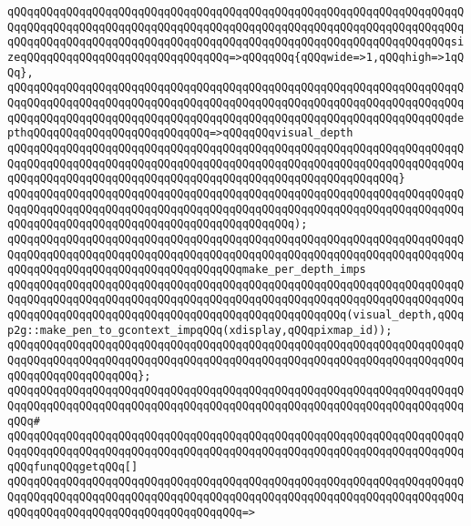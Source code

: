 \verb|qQQqqQQqqQQqqQQqqQQqqQQqqQQqqQQqqQQqqQQqqQQqqQQqqQQqqQQqqQQqqQQqqQQqqQQqqQQqqQQqqQQqqQQqqQQqqQQqqQQqqQQqqQQqqQQqqQQqqQQqqQQqqQQqqQQqqQQqqQQqqQQqqQQqqQQqqQQqqQQqqQQqqQQqqQQqqQQqqQQqqQQqqQQqqQQqqQQqqQQqqQQqqQQqsizeqQQqqQQqqQQqqQQqqQQqqQQqqQQqqQQq=>qQQqqQQq{qQQqwide=>1,qQQqhigh=>1qQQq},|\newline
\verb|qQQqqQQqqQQqqQQqqQQqqQQqqQQqqQQqqQQqqQQqqQQqqQQqqQQqqQQqqQQqqQQqqQQqqQQqqQQqqQQqqQQqqQQqqQQqqQQqqQQqqQQqqQQqqQQqqQQqqQQqqQQqqQQqqQQqqQQqqQQqqQQqqQQqqQQqqQQqqQQqqQQqqQQqqQQqqQQqqQQqqQQqqQQqqQQqqQQqqQQqqQQqqQQqdepthqQQqqQQqqQQqqQQqqQQqqQQqqQQq=>qQQqqQQqvisual_depth|\newline
\verb|qQQqqQQqqQQqqQQqqQQqqQQqqQQqqQQqqQQqqQQqqQQqqQQqqQQqqQQqqQQqqQQqqQQqqQQqqQQqqQQqqQQqqQQqqQQqqQQqqQQqqQQqqQQqqQQqqQQqqQQqqQQqqQQqqQQqqQQqqQQqqQQqqQQqqQQqqQQqqQQqqQQqqQQqqQQqqQQqqQQqqQQqqQQqqQQqqQQqqQQq}|\newline
\verb|qQQqqQQqqQQqqQQqqQQqqQQqqQQqqQQqqQQqqQQqqQQqqQQqqQQqqQQqqQQqqQQqqQQqqQQqqQQqqQQqqQQqqQQqqQQqqQQqqQQqqQQqqQQqqQQqqQQqqQQqqQQqqQQqqQQqqQQqqQQqqQQqqQQqqQQqqQQqqQQqqQQqqQQqqQQqqQQqqQQqqQQq);|\newline
\newline
\verb|qQQqqQQqqQQqqQQqqQQqqQQqqQQqqQQqqQQqqQQqqQQqqQQqqQQqqQQqqQQqqQQqqQQqqQQqqQQqqQQqqQQqqQQqqQQqqQQqqQQqqQQqqQQqqQQqqQQqqQQqqQQqqQQqqQQqqQQqqQQqqQQqqQQqqQQqqQQqqQQqqQQqqQQqqQQqqQQqmake_per_depth_imps|\newline
\verb|qQQqqQQqqQQqqQQqqQQqqQQqqQQqqQQqqQQqqQQqqQQqqQQqqQQqqQQqqQQqqQQqqQQqqQQqqQQqqQQqqQQqqQQqqQQqqQQqqQQqqQQqqQQqqQQqqQQqqQQqqQQqqQQqqQQqqQQqqQQqqQQqqQQqqQQqqQQqqQQqqQQqqQQqqQQqqQQqqQQqqQQqqQQqqQQq(visual_depth,qQQqp2g::make_pen_to_gcontext_impqQQq(xdisplay,qQQqpixmap_id));|\newline
\verb|qQQqqQQqqQQqqQQqqQQqqQQqqQQqqQQqqQQqqQQqqQQqqQQqqQQqqQQqqQQqqQQqqQQqqQQqqQQqqQQqqQQqqQQqqQQqqQQqqQQqqQQqqQQqqQQqqQQqqQQqqQQqqQQqqQQqqQQqqQQqqQQqqQQqqQQqqQQqqQQq};|\newline
\newline
\verb|qQQqqQQqqQQqqQQqqQQqqQQqqQQqqQQqqQQqqQQqqQQqqQQqqQQqqQQqqQQqqQQqqQQqqQQqqQQqqQQqqQQqqQQqqQQqqQQqqQQqqQQqqQQqqQQqqQQqqQQqqQQqqQQqqQQqqQQqqQQqqQQq#|\newline
\verb|qQQqqQQqqQQqqQQqqQQqqQQqqQQqqQQqqQQqqQQqqQQqqQQqqQQqqQQqqQQqqQQqqQQqqQQqqQQqqQQqqQQqqQQqqQQqqQQqqQQqqQQqqQQqqQQqqQQqqQQqqQQqqQQqqQQqqQQqqQQqqQQqfunqQQqgetqQQq[]|\newline
\verb|qQQqqQQqqQQqqQQqqQQqqQQqqQQqqQQqqQQqqQQqqQQqqQQqqQQqqQQqqQQqqQQqqQQqqQQqqQQqqQQqqQQqqQQqqQQqqQQqqQQqqQQqqQQqqQQqqQQqqQQqqQQqqQQqqQQqqQQqqQQqqQQqqQQqqQQqqQQqqQQqqQQqqQQqqQQqqQQq=>|\newline
